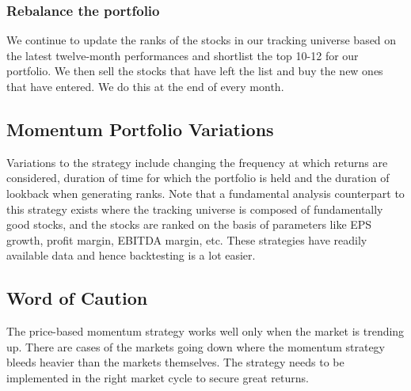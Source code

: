 \documentclass{article}
\begin{document}
\subsubsection{Rebalance the portfolio}
We continue to update the ranks of the stocks in our tracking universe based on
the latest twelve-month performances and shortlist the top 10-12 for our 
portfolio. We then sell the stocks that have left the list and buy the new ones
that have entered. We do this at the end of every month.
\subsection{Momentum Portfolio Variations}
Variations to the strategy include changing the frequency at which returns are
considered, duration of time for which the portfolio is held and the duration of 
lookback when generating ranks. Note that a fundamental analysis counterpart 
to this strategy exists where the tracking universe is composed of 
fundamentally good stocks, and the stocks are ranked on the basis of parameters 
like EPS growth, profit margin, EBITDA margin, etc. These strategies have readily
available data and hence backtesting is a lot easier.
\subsection{Word of Caution}
The price-based momentum strategy works well only when the market is trending
up. There are cases of the markets going down where the momentum strategy bleeds
heavier than the markets themselves. The strategy needs to be implemented in the
right market cycle to secure great returns.
\end{document}
